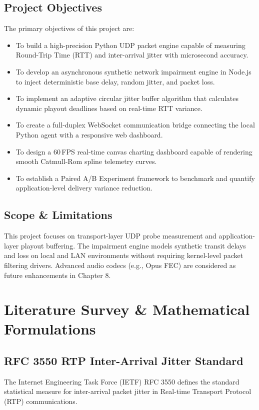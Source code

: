 \documentclass[12pt, a4paper]{report}
\begin{document}
\section{Project Objectives}
The primary objectives of this project are:
\begin{itemize}
    \item To build a high-precision Python UDP packet engine capable of measuring Round-Trip Time (RTT) and inter-arrival jitter with microsecond accuracy.
    \item To develop an asynchronous synthetic network impairment engine in Node.js to inject deterministic base delay, random jitter, and packet loss.
    \item To implement an adaptive circular jitter buffer algorithm that calculates dynamic playout deadlines based on real-time RTT variance.
    \item To create a full-duplex WebSocket communication bridge connecting the local Python agent with a responsive web dashboard.
    \item To design a 60\,FPS real-time canvas charting dashboard capable of rendering smooth Catmull-Rom spline telemetry curves.
    \item To establish a Paired A/B Experiment framework to benchmark and quantify application-level delivery variance reduction.
\end{itemize}

\section{Scope \& Limitations}
This project focuses on transport-layer UDP probe measurement and application-layer playout buffering. The impairment engine models synthetic transit delays and loss on local and LAN environments without requiring kernel-level packet filtering drivers. Advanced audio codecs (e.g., Opus FEC) are considered as future enhancements in Chapter 8.

\newpage
\chapter{Literature Survey \& Mathematical Formulations}

\section{RFC 3550 RTP Inter-Arrival Jitter Standard}
The Internet Engineering Task Force (IETF) RFC 3550 defines the standard statistical measure for inter-arrival packet jitter in Real-time Transport Protocol (RTP) communications.
\end{document}
